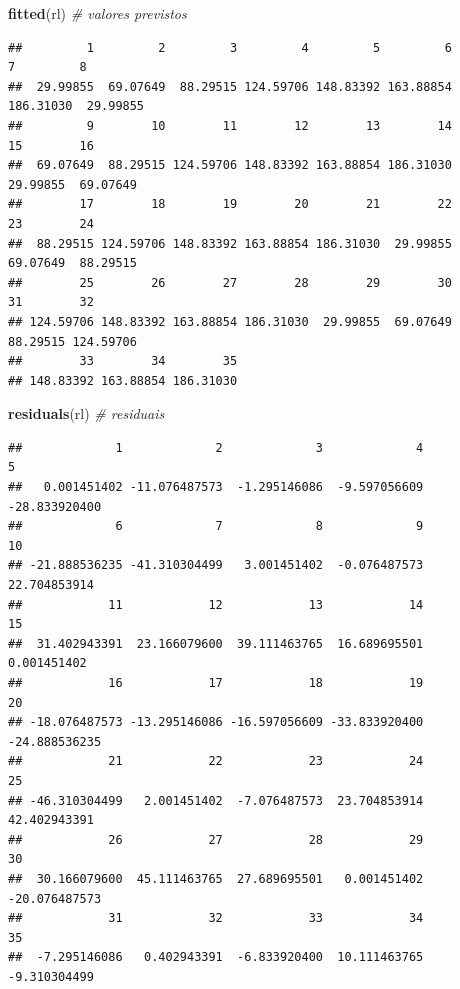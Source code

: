 \documentclass[
]{book}
\newenvironment{Shaded}{\begin{snugshade}}{\end{snugshade}}
\newcommand{\CommentTok}[1]{\textcolor[rgb]{0.56,0.35,0.01}{\textit{#1}}}
\newcommand{\KeywordTok}[1]{\textcolor[rgb]{0.13,0.29,0.53}{\textbf{#1}}}
\newcommand{\NormalTok}[1]{#1}
\begin{document}
\begin{Shaded}
\begin{Highlighting}[]
\KeywordTok{fitted}\NormalTok{(rl) }\CommentTok{# valores previstos}
\end{Highlighting}
\end{Shaded}

\begin{verbatim}
##         1         2         3         4         5         6         7         8 
##  29.99855  69.07649  88.29515 124.59706 148.83392 163.88854 186.31030  29.99855 
##         9        10        11        12        13        14        15        16 
##  69.07649  88.29515 124.59706 148.83392 163.88854 186.31030  29.99855  69.07649 
##        17        18        19        20        21        22        23        24 
##  88.29515 124.59706 148.83392 163.88854 186.31030  29.99855  69.07649  88.29515 
##        25        26        27        28        29        30        31        32 
## 124.59706 148.83392 163.88854 186.31030  29.99855  69.07649  88.29515 124.59706 
##        33        34        35 
## 148.83392 163.88854 186.31030
\end{verbatim}

\begin{Shaded}
\begin{Highlighting}[]
\KeywordTok{residuals}\NormalTok{(rl) }\CommentTok{# residuais}
\end{Highlighting}
\end{Shaded}

\begin{verbatim}
##             1             2             3             4             5 
##   0.001451402 -11.076487573  -1.295146086  -9.597056609 -28.833920400 
##             6             7             8             9            10 
## -21.888536235 -41.310304499   3.001451402  -0.076487573  22.704853914 
##            11            12            13            14            15 
##  31.402943391  23.166079600  39.111463765  16.689695501   0.001451402 
##            16            17            18            19            20 
## -18.076487573 -13.295146086 -16.597056609 -33.833920400 -24.888536235 
##            21            22            23            24            25 
## -46.310304499   2.001451402  -7.076487573  23.704853914  42.402943391 
##            26            27            28            29            30 
##  30.166079600  45.111463765  27.689695501   0.001451402 -20.076487573 
##            31            32            33            34            35 
##  -7.295146086   0.402943391  -6.833920400  10.111463765  -9.310304499
\end{verbatim}
\end{document}
